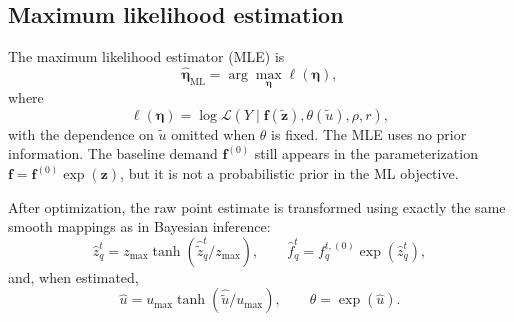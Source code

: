 \subsection{Maximum likelihood estimation}

The maximum likelihood estimator (MLE) is
\[
\widehat{\bm\eta}_{\mathrm{ML}}
=
\arg\max_{\bm\eta}
\ell(\bm\eta),
\]
where
\[
\ell(\bm\eta)
=
\log\mathcal L\!\left(
Y\mid \bm f(\widetilde{\bm z}),\theta(\widetilde u),\rho,r
\right),
\]
with the dependence on $\widetilde u$ omitted when $\theta$ is fixed. The MLE
uses no prior information. The baseline demand $\bm f^{(0)}$ still appears in
the parameterization $\bm f=\bm f^{(0)}\exp(\bm z)$, but it is not a probabilistic
prior in the ML objective.

After optimization, the raw point estimate is transformed using exactly the same
smooth mappings as in Bayesian inference:
\[
\widehat{z}_q^t
=z_{\max}\tanh(\widehat{\widetilde z}_q^t/z_{\max}),
\qquad
\widehat f_q^t=f_q^{t,(0)}\exp(\widehat z_q^t),
\]
and, when estimated,
\[
\widehat u
=u_{\max}\tanh(\widehat{\widetilde u}/u_{\max}),
\qquad
\widehat\theta=\exp(\widehat u).
\]

